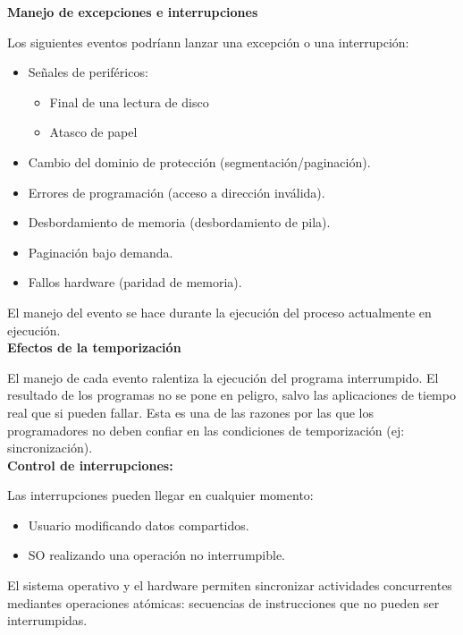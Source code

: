 \documentclass{article}
\begin{document}
\textbf{Manejo de excepciones e interrupciones}

Los siguientes eventos podríann lanzar una excepción o una interrupción:
\begin{itemize}
\item Señales de periféricos:
	\begin{itemize}
	\item Final de una lectura de disco
	\item Atasco de papel
	\end{itemize}
	
\item Cambio del dominio de protección (segmentación/paginación).

\item Errores de programación (acceso a dirección inválida).

\item Desbordamiento de memoria (desbordamiento de pila).

\item Paginación bajo demanda.

\item Fallos hardware (paridad de memoria).
\end{itemize}

El manejo del evento se hace durante la ejecución del proceso actualmente en ejecución.\\

\textbf{Efectos de la temporización}

El manejo de cada evento ralentiza la ejecución del programa interrumpido. El resultado de los programas no se pone en peligro, salvo las aplicaciones de tiempo real que si pueden fallar. Esta es una de las razones por las que los programadores no deben confiar en las condiciones de temporización (ej: sincronización). \\

\textbf{Control de interrupciones:}

Las interrupciones pueden llegar en cualquier momento:
\begin{itemize}
\item Usuario modificando datos compartidos.

\item SO realizando una operación no interrumpible.
\end{itemize}

El sistema operativo y el hardware permiten sincronizar actividades concurrentes mediantes operaciones atómicas: secuencias de instrucciones que no pueden ser interrumpidas. \\
\end{document}

